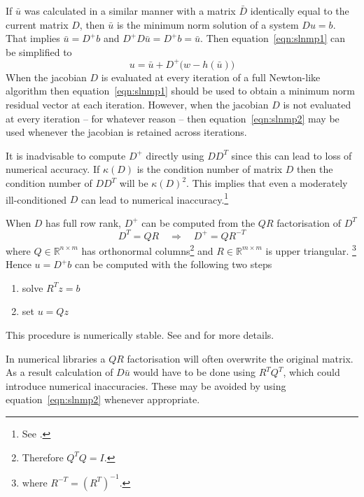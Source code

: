\documentclass[english,memorandum,old,sectionpage]{cpbart}
\newcommand{\V}[1]{\mathit{#1}}
\newcommand{\Rbb}{\mathbb{R}}
\newcommand*{\ubar}{\bar{u}}
\newcommand*{\Dbar}{\bar{D}}
\begin{document}
If $\ubar$ was calculated in a similar manner with a matrix
$\Dbar$ identically equal to the current matrix $D$,
then  $\ubar$ is the minimum norm solution of a system $D u = b$.
That implies $\ubar = D^+ b$ and $D^+ D \ubar = D^+ b = \ubar$.
Then equation~\eqref{eqn:slnmp1} can be simplified to
\begin{equation}\label{eqn:slnmp2}
u = \ubar+ D^+ \bigl(w - h(\ubar)\bigr)
\end{equation}
%
When the jacobian $D$  is evaluated at every iteration of a
full Newton-like algorithm then  equation~\eqref{eqn:slnmp1}
should be used to obtain a minimum norm residual vector at each iteration.
However, when the jacobian $D$  is not evaluated at every iteration
-- for whatever reason --
then  equation~\eqref{eqn:slnmp2} may be used
whenever the jacobian is retained across iterations.

It is inadvisable to compute $D^+$ directly using $D D^T$
since this can lead to loss of numerical accuracy. If
$\kappa(D)$ is the condition number of matrix $D$ then the condition number
of $D D^T$ will be $\kappa(D)^2$.
This implies that even a moderately ill-conditioned $D$ can lead
to numerical inaccuracy.\footnote{See \cite{clineplemmons}.}

When $D$ has full row rank, $D^+$ can be computed from the
$\V{QR}$ factorisation of $D^T$%
\begin{displaymath}
D^T = QR \quad \Rightarrow \quad D^+ = Q R^{-T}
\end{displaymath}
where $Q\in \Rbb^{n \times m}$ has orthonormal columns\footnote{Therefore $Q^TQ=I$.}
and $R \in \Rbb^{m \times m}$ is upper triangular.%
\footnote{where $R^{-T}=(R^T)^{-1}$.}
Hence $u = D^+ b$ can be computed with the following two steps

\begin{enumerate}
\item solve $R^T z = b$
\item set $u = Q z$
\end{enumerate}
This procedure is numerically stable.
See \cite{matcomp} and \cite{nlaopt} for more details.

In numerical libraries a $\V{QR}$ factorisation will often overwrite
the original matrix. As a result calculation of $D \ubar$ would
have to be done using $R^T Q^T$, which could introduce numerical
inaccuracies. These may be avoided by using equation~\eqref{eqn:slnmp2}
whenever appropriate.

\end{document}
